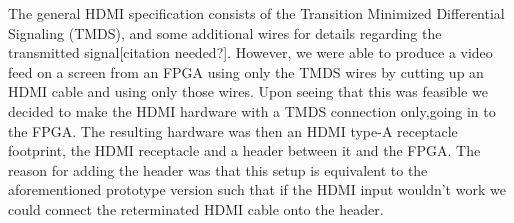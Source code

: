 The general HDMI specification consists of the Transition Minimized Differential Signaling (TMDS), and some additional wires for details regarding the transmitted signal[citation needed?].
However, we were able to produce a video feed on a screen from an FPGA using only the TMDS wires by cutting up an HDMI cable and using only those wires.
Upon seeing that this was feasible we decided to make the HDMI hardware with a TMDS connection only,going in to the FPGA. The resulting hardware was then an HDMI type-A receptacle footprint, the HDMI receptacle and a header between it and the FPGA.
The reason for adding the header was that this setup is equivalent to the aforementioned prototype version such that if the HDMI input wouldn't work we could connect the reterminated HDMI cable onto the header.
